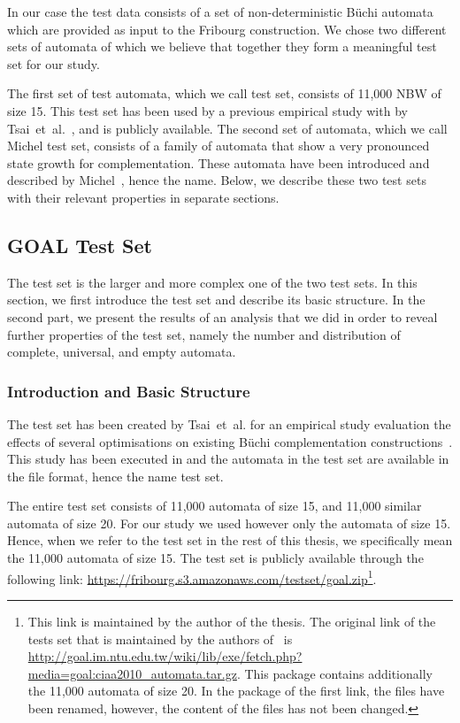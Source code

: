 In our case the test data consists of a set of non-deterministic Büchi automata which are provided as input to the Fribourg construction. We chose two different sets of automata of which we believe that together they form a meaningful test set for our study.

The first set of test automata, which we call \goal{} test set, consists of 11,000 NBW of size 15. This test set has been used by a previous empirical study with \goal{} by Tsai~et~al.~\cite{2011_tsai}, and is publicly available. The second set of automata, which we call Michel test set, consists of a family of automata that show a very pronounced state growth for complementation. These automata have been introduced and described by Michel~\cite{michel1988}, hence the name. Below, we describe these two test sets with their relevant properties in separate sections.


\subsection{GOAL Test Set}
\label{4_goal_testset}
The \goal{} test set is the larger and more complex one of the two test sets. In this section, we first introduce the \goal{} test set and describe its basic structure. In the second part, we present the results of an analysis that we did in order to reveal further properties of the \goal{} test set, namely the number and distribution of complete, universal, and empty automata.

\subsubsection{Introduction and Basic Structure}
The \goal{} test set has been created by Tsai~et~al. for an empirical study evaluation the effects of several optimisations on existing Büchi complementation constructions~\cite{2011_tsai}. This study has been executed in \goal{} and the automata in the test set are available in the \goal{} file format, hence the name \goal{} test set.

The entire test set consists of 11,000 automata of size 15, and 11,000 similar automata of size 20. For our study we used however only the automata of size 15. Hence, when we refer to the \goal{} test set in the rest of this thesis, we specifically mean the 11,000 automata of size 15. The \goal{} test set is publicly available through the following link: \url{https://fribourg.s3.amazonaws.com/testset/goal.zip}\footnote{This link is maintained by the author of the thesis. The original link of the \goal{} tests set that is maintained by the authors of~\cite{2011_tsai} is \url{http://goal.im.ntu.edu.tw/wiki/lib/exe/fetch.php?media=goal:ciaa2010_automata.tar.gz}. This package contains additionally the 11,000 automata of size 20. In the package of the first link, the files have been renamed, however, the content of the files has not been changed.}.

